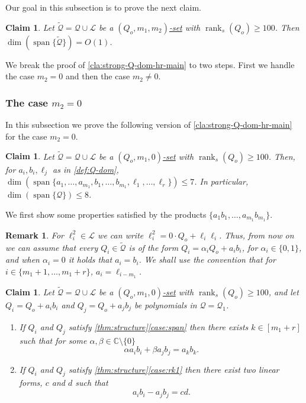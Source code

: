 \documentclass[10pt,a4paper]{article}
\newtheorem{claim}[theorem]{Claim}
\newtheorem{remark}[theorem]{Remark}
\def\rank{\operatorname{rank}}
\renewcommand{\C}{\mathbb{C}}
\newcommand{\calL}{{\mathcal{L}}}
\newcommand{\cQ}{{\mathcal{Q}}}
\newcommand{\MVar}[2]{{#1}_1,\ldots, {#1}_{#2}}
\newcommand{\spn}[1]{\operatorname{span}\{{#1}\}}
\newcommand{\rkq}{100}
\begin{document}
Our goal in this subsection is to prove the next claim.

\begin{claim}\label{cla:strong-Q-dom-hr-main}
Let $\tilde{\cQ} = \cQ \cup \calL$ be a \hyperref[def:Q-dom]{$(Q_o,m_1,m_2)$-set} with $\rank_s(Q_o)\geq \rkq$.
Then $\dim(\spn{\tilde{\cQ}}) = O(1)$.
\end{claim}

We break the proof of \autoref{cla:strong-Q-dom-hr-main} to two steps. First we handle the case $m_2=0$ and then the case $m_2\neq 0$.



\subsubsection{The case $m_2=0$}\label{sec:m2=0-hr}

In this subsection we prove the following version of \autoref{cla:strong-Q-dom-hr-main} for the case $m_2=0$.

\begin{claim}\label{cla:strong-Q-dom-hr}
Let $\tilde{\cQ} = \cQ \cup \calL$ be a \hyperref[def:Q-dom]{$(Q_o,m_1,0)$-set} with $\rank_s(Q_o)\geq \rkq$.
Then, for $a_i,b_i, \ell_j$ as in \autoref{def:Q-dom}, $\dim(\spn{\MVar{a}{m_1}, \MVar{b}{m_1}, \MVar{\ell}{r}})\leq 7$. In particular, $\dim(\spn{\cQ}) \leq 8$.
\end{claim}

We first show some properties satisfied by the products $\lbrace a_1b_1, \ldots, a_{m_1}b_{m_1}\rbrace$.

\begin{remark}\label{rem:alpha}
	For $\ell_i^2 \in \calL$ we can write $\ell^2_i = 0\cdot Q_o + \ell_i\ell_i$. Thus, from now on we can assume that every $Q_i \in \tilde{\cQ}$ is of the form $Q_i = \alpha_i Q_o + a_ib_i$, for $\alpha_i\in\{0,1\}$, and when $\alpha_i =0$ it holds that $a_i=b_i$. We shall use the convention that for $i\in\{m_1+1,\ldots,m_1+r\}$, $a_i = \ell_{i-m_1}$.
\end{remark}

\begin{claim}\label{cla:span-rank1-hr}
Let $\tilde{\cQ} = \cQ \cup \calL$ be a \hyperref[def:Q-dom]{$(Q_o,m_1,0)$-set} with $\rank_s(Q_o)\geq \rkq$, and let  $Q_i=Q_o+a_ib_i$ and $Q_j= Q_o+a_jb_j$ be polynomials in $\cQ = \cQ_1$. 
\begin{enumerate}
\item If $Q_i$ and $Q_j$ satisfy \autoref{thm:structure}\ref{case:span} then there exists $k\in [m_1+r]$ such that for some $\alpha,\beta \in \C\setminus\{0\}$
\begin{equation} \label{eq:1-alpha-hr}
 \alpha a_ib_i + \beta a_jb_j = a_k b_k. 
\end{equation}
 \item If $Q_i$ and $Q_j$ satisfy \autoref{thm:structure}\ref{case:rk1} then there exist two linear forms, $c$ and $d$ such that
\begin{equation}
 a_ib_i -  a_jb_j = cd.
\end{equation}
\end{enumerate}
\end{claim}
\end{document}
